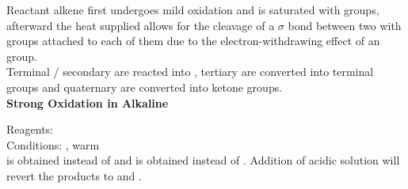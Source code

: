 \documentclass[../main]{subfiles}
\begin{document}
	Reactant alkene first undergoes mild oxidation and is saturated with  groups, afterward the heat supplied allows for the cleavage of a \(\sigma\) bond between two  with  groups attached to each of them due to the electron-withdrawing effect of an  group. \\

	Terminal / secondary  are reacted into , tertiary  are converted into terminal  groups and quaternary  are converted into ketone groups. \\

	\noindent \textbf{Strong Oxidation in Alkaline}

	Reagents: \\
	Conditions: , warm\\

	 is obtained instead of  and  is obtained instead of . Addition of acidic solution will revert the products to  and .
\end{document}
